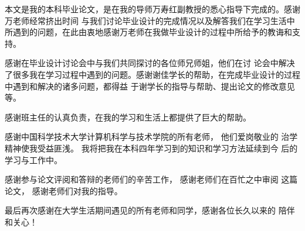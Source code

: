 
\begin{acknowledgements}

本文是我的本科毕业论文，是在我的导师万寿红副教授的悉心指导下完成的。感谢万老师经常挤出时间
与我们讨论毕业设计的完成情况以及解答我们在学习生活中所遇到的问题，在此由衷地感谢万老师在我做毕业设计的过程中所给予的教诲和支持。

感谢在毕业设计讨论会中与我们共同探讨的各位师兄师姐，他们在讨
论会中解决了很多我在学习过程中遇到的问题。感谢谢佳学长的帮助，在完成毕业设计的过程中遇到和解决的诸多问题，都得益
于谢学长的指导与帮助、提出论文的修改意见等。

感谢班主任的认真负责，在我的学习和生活上都提供了巨大的帮助。

感谢中国科学技术大学计算机科学与技术学院的所有老师， 他们爱岗敬业的
治学精神使我受益匪浅。 我将把我在本科四年学习到的知识和学习方法延续到今
后的学习与工作中。

感谢参与论文评阅和答辩的老师们的辛苦工作， 感谢老师们在百忙之中审阅
这篇论文， 感谢老师们对我的指导。

最后再次感谢在大学生活期间遇见的所有老师和同学，感谢各位长久以来的
陪伴和关心！
\newpage
\end{acknowledgements}
